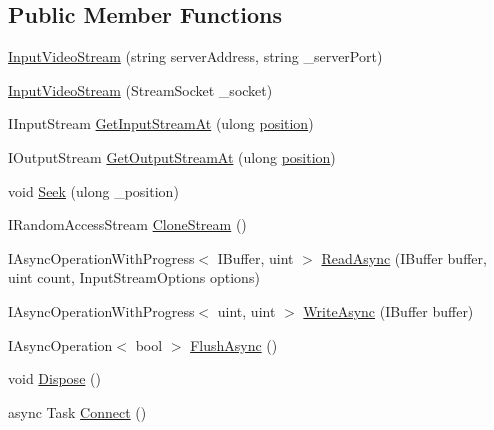 \subsection*{Public Member Functions}
\begin{DoxyCompactItemize}
\item 
\hyperlink{class_e_l_i_client_1_1_input_video_stream_aeb09c4dec65a8619e609b66dc27e7b0c}{Input\+Video\+Stream} (string server\+Address, string \+\_\+server\+Port)
\item 
\hyperlink{class_e_l_i_client_1_1_input_video_stream_a079b3eb4e5f092178ad6f43568931f38}{Input\+Video\+Stream} (Stream\+Socket \+\_\+socket)
\item 
I\+Input\+Stream \hyperlink{class_e_l_i_client_1_1_input_video_stream_afc0e6cd66887bc975d7d188676616715}{Get\+Input\+Stream\+At} (ulong \hyperlink{class_e_l_i_client_1_1_input_video_stream_afa8afb29384563f3abc625defc4847a4}{position})
\item 
I\+Output\+Stream \hyperlink{class_e_l_i_client_1_1_input_video_stream_a03a67d8daf2056898db1f3d5a5cb24ae}{Get\+Output\+Stream\+At} (ulong \hyperlink{class_e_l_i_client_1_1_input_video_stream_afa8afb29384563f3abc625defc4847a4}{position})
\item 
void \hyperlink{class_e_l_i_client_1_1_input_video_stream_af6ad40c0bd8e0da1c0d185160e1f7067}{Seek} (ulong \+\_\+position)
\item 
I\+Random\+Access\+Stream \hyperlink{class_e_l_i_client_1_1_input_video_stream_aa61efafce04f69a274a8fa268b6bc80f}{Clone\+Stream} ()
\item 
I\+Async\+Operation\+With\+Progress$<$ I\+Buffer, uint $>$ \hyperlink{class_e_l_i_client_1_1_input_video_stream_a340ba3e2d2df24bcc4881af011c1a556}{Read\+Async} (I\+Buffer buffer, uint count, Input\+Stream\+Options options)
\item 
I\+Async\+Operation\+With\+Progress$<$ uint, uint $>$ \hyperlink{class_e_l_i_client_1_1_input_video_stream_a16dd12ce8ad7d0805b484ec11c646b3e}{Write\+Async} (I\+Buffer buffer)
\item 
I\+Async\+Operation$<$ bool $>$ \hyperlink{class_e_l_i_client_1_1_input_video_stream_adca4012402bc11d8608c7db75e805d02}{Flush\+Async} ()
\item 
void \hyperlink{class_e_l_i_client_1_1_input_video_stream_abd17d210dacc53836bb8f3de41483ae9}{Dispose} ()
\item 
async Task \hyperlink{class_e_l_i_client_1_1_input_video_stream_ad67ec2d0d414888dd58ac0adbd174645}{Connect} ()
\end{DoxyCompactItemize}
